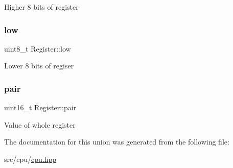 Higher 8 bits of register \mbox{\label{unionRegister_ab3de0c995f96ded882a98602123a2d0a}} 
\subsubsection{\texorpdfstring{low}{low}}
{\footnotesize\ttfamily uint8\+\_\+t Register\+::low}

Lower 8 bits of regiser \mbox{\label{unionRegister_aac323348d1529a834f8b013deecf048c}} 
\subsubsection{\texorpdfstring{pair}{pair}}
{\footnotesize\ttfamily uint16\+\_\+t Register\+::pair}

Value of whole register 

The documentation for this union was generated from the following file\+:\begin{DoxyCompactItemize}
\item 
src/cpu/\mbox{\hyperlink{cpu_8hpp}{cpu.\+hpp}}\end{DoxyCompactItemize}

